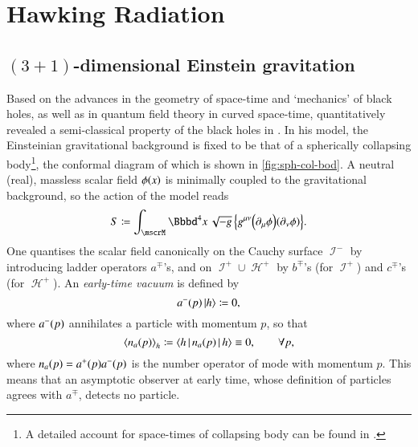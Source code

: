 \chapter{Hawking Radiation}
\label{chap:hawrad}

\section{$(3+1)$-dimensional Einstein gravitation}
\label{sec:hawrad-einstein}

Based on the advances in the geometry of space-time and `mechanics' of black 
holes, as well as in quantum field theory in curved space-time, 
\citeauthor{HAWKING1974} quantitatively revealed a semi-classical property of 
the black holes in \cite{HAWKING1974}. In his model, the Einsteinian 
gravitational 
background is fixed to be that of a spherically collapsing body\footnote{A 
detailed account for space-times of collapsing body can be found in 
\cite{Joshi2007}.}, the conformal diagram of which is shown in 
\cref{fig:sph-col-bod}. A neutral (real), massless scalar field ${\phi}\mathopen{}\left(x\right)\mathclose{}$ 
is minimally coupled to the gravitational background, so the action of the model 
reads
\begin{equation}
S \coloneqq \int_{\mscrM} {\dd^4 x} \,\sqrt{-g}\,
\cbr{g^{\mu\nu}\rbr{\partial_\mu \phi}\rbr{\partial_\nu \phi}}.
\end{equation}
One quantises the scalar field canonically on the Cauchy surface $\mscrI^-$ by 
introducing ladder operators $a^\mp$'s, and on $\mscrI^+ \cup \mscrH^+$ by 
$b^\mp$'s (for $\mscrI^+$) and $c^\mp$'s (for $\mscrH^+$). An \emph{early-time 
vacuum} is defined by
\begin{equation}
	{a^-}\mathopen{}\left(p\right)\mathclose{}\Ket{h} \coloneqq 0,
\end{equation}
where ${a^-}\mathopen{}\left(p\right)\mathclose{}$ annihilates a particle with momentum $p$, so that
\begin{equation}
{\left<{{n}_a}\mathopen{}\left(p\right)\mathclose{}\right>}_h \coloneqq \Braket{h | {{n}_a}\mathopen{}\left(p\right)\mathclose{} | h} 
\equiv 0,\qquad \forall p,
\end{equation}
where ${n_a}\mathopen{}\left(p\right)\mathclose{} = {a^+}\mathopen{}\left(p\right)\mathclose{}{a^-}\mathopen{}\left(p\right)\mathclose{}$ is the number operator of 
mode with momentum $p$. This means that an asymptotic observer at early time, 
whose definition of particles agrees with $a^\mp$, detects no particle.

